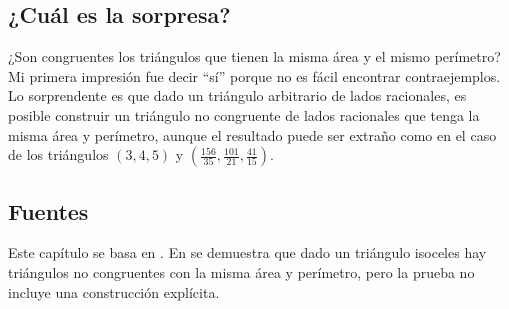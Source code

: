 \subsection*{¿Cuál es la sorpresa?}

¿Son congruentes los triángulos que tienen la misma área y el mismo perímetro? Mi primera impresión fue decir ``sí'' porque no es fácil encontrar contraejemplos. Lo sorprendente es que dado un triángulo arbitrario de lados racionales, es posible construir un triángulo no congruente de lados racionales que tenga la misma área y perímetro, aunque el resultado puede ser extraño como en el caso de los triángulos $(3,4,5)$ y $\left(\frac{156}{35}, \frac{101}{21}, \frac{41}{15}\right)$.

\subsection*{Fuentes}

Este capítulo se basa en \cite{mccallum}. En \cite{marita} se demuestra que dado un triángulo isoceles hay triángulos no congruentes con la misma área y perímetro, pero la prueba no incluye una construcción explícita.
